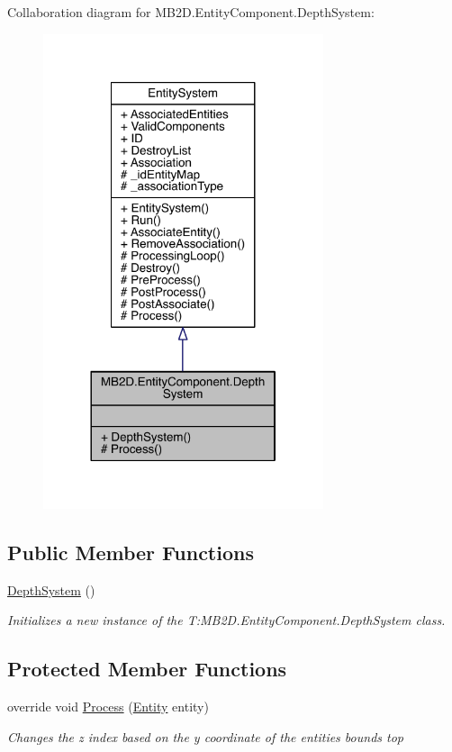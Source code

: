 Collaboration diagram for M\+B2\+D.\+Entity\+Component.\+Depth\+System\+:
\nopagebreak
\begin{figure}[H]
\begin{center}
\leavevmode
\includegraphics[width=233pt]{class_m_b2_d_1_1_entity_component_1_1_depth_system__coll__graph}
\end{center}
\end{figure}
\subsection*{Public Member Functions}
\begin{DoxyCompactItemize}
\item 
\hyperlink{class_m_b2_d_1_1_entity_component_1_1_depth_system_a5a7f2fc4d65f99bb89624cbcd1d52d65}{Depth\+System} ()
\begin{DoxyCompactList}\small\item\em Initializes a new instance of the T\+:\+M\+B2\+D.\+Entity\+Component.\+Depth\+System class. \end{DoxyCompactList}\end{DoxyCompactItemize}
\subsection*{Protected Member Functions}
\begin{DoxyCompactItemize}
\item 
override void \hyperlink{class_m_b2_d_1_1_entity_component_1_1_depth_system_a738556bdf819c9c0d4082a323a502c58}{Process} (\hyperlink{class_m_b2_d_1_1_entity_component_1_1_entity}{Entity} entity)
\begin{DoxyCompactList}\small\item\em Changes the z index based on the y coordinate of the entities bounds top \end{DoxyCompactList}\end{DoxyCompactItemize}
